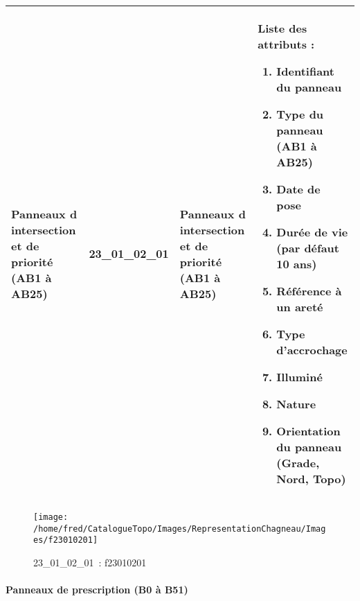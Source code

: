 \documentclass[12pt,titlepage]{book}
\begin{document}
\renewcommand{\arraystretch}{1.2}
\begin{supertabular}{|p{10cm}|c|p{13cm}|p{12cm}|}
 Panneaux d intersection et de priorité (AB1 à AB25) & 23\_01\_02\_01 & Panneaux d intersection et de priorité (AB1 à AB25) & Liste des attributs :
\begin{enumerate}
  \item Identifiant du panneau  \item Type du panneau (AB1 à AB25)  \item Date de pose  \item Durée de vie (par défaut 10 ans)  \item Référence à un areté  \item Type d'accrochage  \item Illuminé  \item Nature  \item Orientation du panneau (Grade, Nord, Topo)\end{enumerate}
\\
\hline
\end{supertabular}
\begin{figure}[h!]
  \hfill         %
  \begin{minipage}[t]{3cm}
    \begin{center}
      \texttt{[image: /home/fred/CatalogueTopo/Images/RepresentationChagneau/Images/f23010201]}
      \caption[~23\_01\_02\_01]{\small{23\_01\_02\_01~:} \tiny{f23010201}}\label{f23010201}
    \end{center}
  \end{minipage}
\end{figure}


\paragraph{Panneaux de prescription (B0 à B51)}
\noindent
\vspace{\baselineskip}
\end{document}

